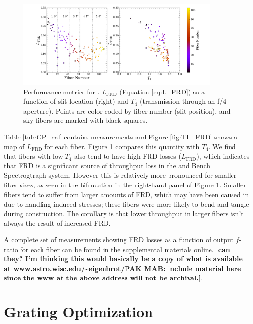\begin{appendices}
\begin{figure}
  \centering
  \includegraphics[width=0.9\textwidth]{891_1/figs/gradpak_Lplots.pdf}
  \caption{\label{fig:FRD_loss} Performance metrics for
    \GP. $L_\mathrm{FRD}$ (Equation \ref{eq:L_FRD}) as a function of
    slit location (right) and $T_4$ (transmission through an f/4
    aperture). Points are color-coded by fiber number (slit position),
    and sky fibers are marked with black squares.}
\end{figure}

Table \ref{tab:GP_cal} contains measurements and Figure
\ref{fig:TL_FRD} shows a map of $L_\mathrm{FRD}$ for each \GP
fiber. Figure \ref{fig:FRD_loss} compares this quantity with $T_4$. We
find that fibers with low $T_4$ also tend to have high FRD losses
($L_\mathrm{FRD}$), which indicates that FRD is a significant source
of throughput loss in the \GP and Bench Spectrogtraph system.  However
this is relatively more pronounced for smaller fiber sizes, as seen in
the bifrucation in the right-hand panel of Figure
\ref{fig:FRD_loss}. Smaller fibers tend to suffer from larger amounts
of FRD, which may have been caused in \GP due to handling-induced
stresses; these fibers were more likely to bend and tangle during
construction.  The corollary is that lower throughput in larger fibers
isn't always the result of increased FRD.

A complete set of measurements showing FRD losses as a function of
output $f$-ratio for each fiber can be found in the supplemental
materials online. {\bf [can they? I'm thinking this would basically be
    a copy of what is available at
    \url{www.astro.wisc.edu/~eigenbrot/PAK} MAB: include material here
    since the www at the above address will not be archival.]}.

% 

\section{Grating Optimization}
\label{sec:grating}


\end{appendices}
